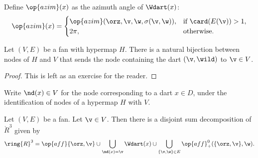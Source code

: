 \begin{definition}[$\op{azim}$]
Define $\op{azim}(x)$ as the azimuth angle of $\Wdart(x)$:
%
\begin{displaymath}
\op{azim}(x)=\begin{cases}
\op{azim}(\orz,\v,\w,\sigma(\v,\w)), &\text{if } \card(E(\v)) > 1,\\
2\pi, & \text{otherwise.}\\
\end{cases}
\end{displaymath}
\end{definition}


\begin{lemma}[]\label{lemma:node-vertex}
Let $(V,E)$ be a fan with hypermap $H$.  There is a natural bijection between
nodes of $H$ and $V$ that sends the node containing the dart $(\v,\wild)$
to $\v\in V$.
\end{lemma}

\begin{proof}  This is left as an exercise for the reader.
\end{proof}

\begin{definition}[$\nd$]
Write $\nd(x)\in V$ for the node corresponding to a dart $x\in D$,
under the identification of nodes of a hypermap $H$ with $V$.
\end{definition}

\begin{lemma}\label{lemma:disjoint}
  Let $(V,E)$ be a fan.  Let $\v\in V$.  Then there is a disjoint sum
  decomposition of $\ring{R}^3$ given by
\begin{displaymath}
\ring{R}^3 = 
\op{aff}\{\orz,\v\} \cup
\bigcup_{\nd(x)=\v} \Wdart(x)  \cup 
\bigcup_{\{\v,\w\}\in E} \op{aff}_+^0(\{\orz,\v\},\w).
\end{displaymath}
\end{lemma}
%
%
%





